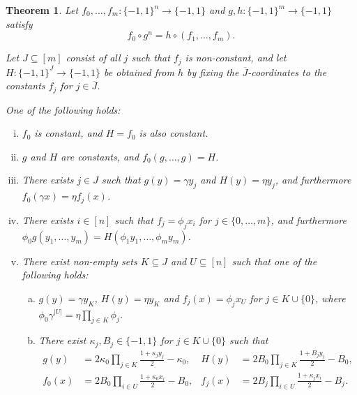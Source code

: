 \documentclass{article}
\newtheorem{theorem}{Theorem}[section]
\theoremstyle{definition}
\theoremstyle{remark}
\begin{document}
\begin{theorem} \label{thm:main-g-h}
Let $f_0,\ldots,f_m\colon \{-1,1\}^n \to \{-1,1\}$ and $g,h\colon \{-1,1\}^m \to \{-1,1\}$ satisfy
\[
 f_0 \circ g^n = h \circ (f_1,\ldots,f_m).
\]

Let $J \subseteq [m]$ consist of all $j$ such that $f_j$ is non-constant, and let $H\colon \{-1,1\}^J \to \{-1,1\}$ be obtained from $h$ by fixing the $\overline{J}$-coordinates to the constants $f_j$ for $j \in \overline{J}$.

One of the following holds:
\begin{enumerate}[(i)]
\item $f_0$ is constant, and $H = f_0$ is also constant. \label{c:f0-H-const}
\item $g$ and $H$ are constants, and $f_0(g,\ldots,g) = H$. \label{c:g-H-const}
\item There exists $j \in J$ such that $g(y) = \gamma y_j$ and $H(y) = \eta y_j$, and furthermore $f_0(\gamma x) = \eta f_j(x)$. \label{c:g-H-dict}
\item There exists $i \in [n]$ such that $f_j = \phi_j x_i$ for $j \in \{0,\ldots,m\}$, and furthermore $\phi_0 g(y_1,\ldots,y_m) = H(\phi_1 y_1, \ldots, \phi_m y_m)$. \label{c:f-dict}
\item There exist non-empty sets $K \subseteq J$ and $U \subseteq [n]$ such that one of the following holds: \label{c:prod}
\begin{enumerate}[(a)]
\item $g(y) = \gamma y_K$, $H(y) = \eta y_K$ and $f_j(x) = \phi_j x_U$ for $j \in K \cup \{0\}$, where $\phi_0 \gamma^{|U|} = \eta \prod_{j \in K} \phi_j$. \label{c:XOR}
\item There exist $\kappa_j,B_j \in \{-1,1\}$ for $j \in K \cup \{0\}$ such that \label{c:AND}
\begin{align*}
g(y) &= 2\kappa_0 \prod_{j \in K} \frac{1 + \kappa_j y_j}{2} - \kappa_0,
&	
H(y) &= 2B_0 \prod_{j \in K} \frac{1 + B_j y_j}{2} - B_0,
\\
f_0(x) &= 2B_0 \prod_{i \in U} \frac{1 + \kappa_0 x_i}{2} - B_0,
&
f_j(x) &= 2B_j \prod_{i \in U} \frac{1 + \kappa_j x_i}{2} - B_j.
\end{align*}
\end{enumerate}
\end{enumerate}
\end{theorem}
\end{document}
